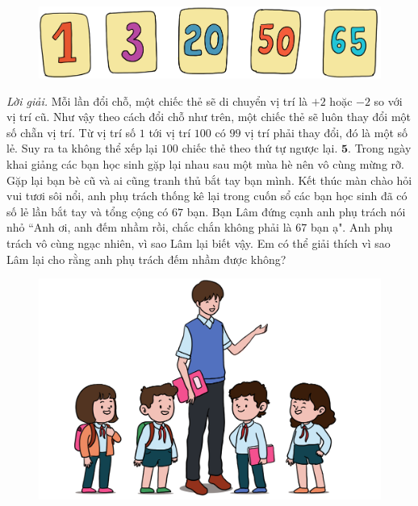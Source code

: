 \begin{multicols}{2}
	\begin{figure}[H]
		\centering
		\vspace*{-10pt}
		\captionsetup{labelformat= empty, justification=centering}
		\includegraphics[width=0.98\linewidth]{Pi10_ToanBi_Bai4}
		\vspace*{-10pt}
	\end{figure}
	\textit{Lời giải.} 	Mỗi lần đổi chỗ, một chiếc thẻ sẽ di chuyển vị trí là $+2$ hoặc $-2$ so với vị trí cũ. Như vậy theo cách đổi chỗ như trên, một chiếc thẻ sẽ luôn thay đổi một số chẵn vị trí. Từ vị trí số $1$ tới vị trí $100$ có $99$ vị trí phải thay đổi, đó là một số lẻ. Suy ra ta không thể xếp lại $100$ chiếc thẻ theo thứ tự ngược lại.
	\vskip 0.1cm
	$\pmb{5.}$ Trong ngày khai giảng các bạn học sinh gặp lại nhau sau một mùa hè nên vô cùng mừng rỡ. Gặp lại bạn bè cũ và ai cũng tranh thủ bắt tay bạn mình. Kết thúc màn chào hỏi vui tươi sôi nổi, anh phụ trách thống kê lại trong cuốn sổ các bạn học sinh đã có số lẻ lần bắt tay và tổng cộng có $67$ bạn. Bạn Lâm đứng cạnh anh phụ trách nói nhỏ ``Anh ơi, anh đếm nhầm rồi, chắc chắn không phải là $67$ bạn ạ". Anh phụ trách vô cùng ngạc nhiên, vì sao Lâm lại biết vậy. Em có thể giải thích vì sao Lâm lại cho rằng anh phụ trách đếm nhầm được không?
	\begin{figure}[H]
		\centering
		\vspace*{-10pt}
		\captionsetup{labelformat= empty, justification=centering}
		\includegraphics[width=0.9\linewidth]{Pi10_ToanBi_Bai5}
		\vspace*{-10pt}

\end{figure}
\end{multicols}
